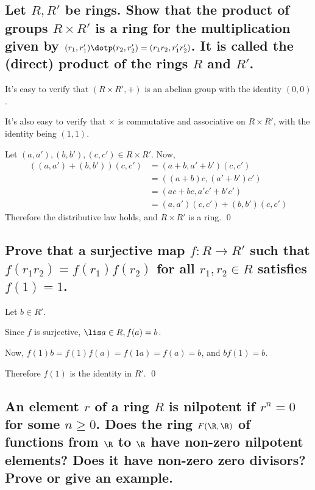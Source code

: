 \section[Problem 3]{}
    \subsection[(i)]{Let $R, R'$ be rings. Show that the product of groups $R\times R'$
        is a ring for the multiplication given by $(r_1, r_1') \dotp (r_2, r_2') = (r_1r_2, r_1'r_2')$.
        It is called the (direct) product of the rings $R$ and $R'$.}

        It's easy to verify that $(R \times R', +)$ is an abelian group with the identity $(0,0)$.

        It's also easy to verify that $\times$ is commutative and associative on $R\times R'$, 
        with the identity being $(1,1)$.

        Let $(a, a'), (b,b'), (c,c') \in R\times R'$.
        Now, \begin{align*}
            ((a,a') + (b,b')) (c, c')
            &= (a+b, a'+b') (c,c') \\
            &= ((a+b)c, (a'+b')c') \\
            &= (ac+bc, a'c'+b'c') \\
            &= (a,a')(c,c') + (b,b')(c,c')
        \end{align*}
        Therefore the distributive law holds, and
        $R\times R'$ is a ring.
        \qed

    \subsection[(ii)]{Prove that a surjective map $f: R \to R'$ such that $f(r_1r_2) = f(r_1)f(r_2)$
        for all $r_1, r_2 \in R$ satisfies $f(1) = 1$.}
        Let $b \in R'$.

        Since $f$ is surjective, $\lis a \in R, f(a) = b$.

        Now, $f(1)b = f(1)f(a) = f(1a) = f(a) = b$, and $bf(1) = b$.
        
        Therefore $f(1)$ is the identity in $R'$.
        \qed

    \subsection[(iii)]{An element $r$ of a ring $R$ is nilpotent if $r^n = 0$ for some $n \geq 0$.
        Does the ring $F(\R, \R)$ of functions from $\R$ to $\R$ have non-zero nilpotent elements?
        Does it have non-zero zero divisors? Prove or give an example.}

